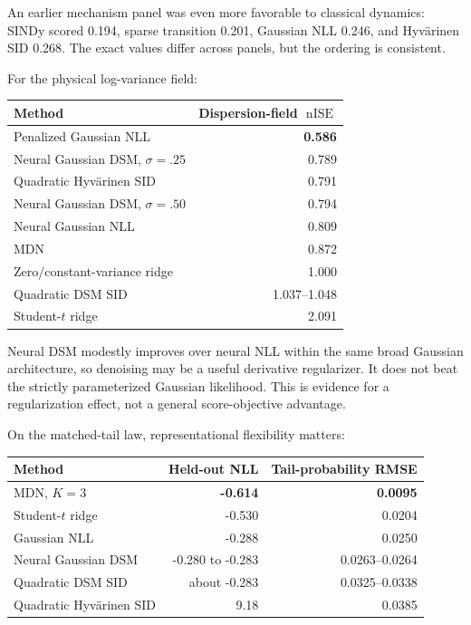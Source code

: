 \documentclass[10pt]{article}
\newcommand{\nise}{\operatorname{nISE}}
\begin{document}
An earlier mechanism panel was even more favorable to classical dynamics: SINDy scored 0.194, sparse transition 0.201, Gaussian NLL 0.246, and Hyv\"arinen SID 0.268. The exact values differ across panels, but the ordering is consistent.

For the physical log-variance field:

\begin{center}
\begin{tabular}{@{}lr@{}}
\toprule
Method & Dispersion-field \(\nise\) \\
\midrule
Penalized Gaussian NLL & \textbf{0.586} \\
Neural Gaussian DSM, \(\sigma=.25\) & 0.789 \\
Quadratic Hyv\"arinen SID & 0.791 \\
Neural Gaussian DSM, \(\sigma=.50\) & 0.794 \\
Neural Gaussian NLL & 0.809 \\
MDN & 0.872 \\
Zero/constant-variance ridge & 1.000 \\
Quadratic DSM SID & 1.037--1.048 \\
Student-\(t\) ridge & 2.091 \\
\bottomrule
\end{tabular}
\end{center}

Neural DSM modestly improves over neural NLL within the same broad Gaussian architecture, so denoising may be a useful derivative regularizer. It does not beat the strictly parameterized Gaussian likelihood. This is evidence for a regularization effect, not a general score-objective advantage.

On the matched-tail law, representational flexibility matters:

\begin{center}
\begin{tabular}{@{}lrr@{}}
\toprule
Method & Held-out NLL & Tail-probability RMSE \\
\midrule
MDN, \(K=3\) & \textbf{-0.614} & \textbf{0.0095} \\
Student-\(t\) ridge & -0.530 & 0.0204 \\
Gaussian NLL & -0.288 & 0.0250 \\
Neural Gaussian DSM & -0.280 to -0.283 & 0.0263--0.0264 \\
Quadratic DSM SID & about -0.283 & 0.0325--0.0338 \\
Quadratic Hyv\"arinen SID & 9.18 & 0.0385 \\
\bottomrule
\end{tabular}
\end{center}
\end{document}
